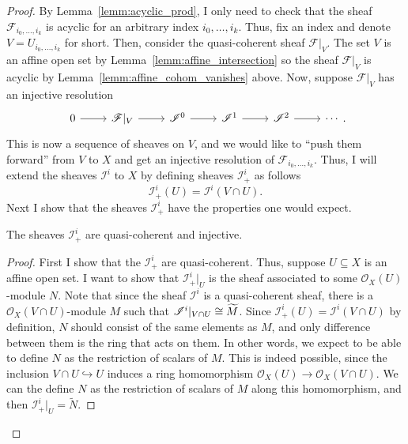 \begin{proof} %
  By Lemma~\ref{lemm:acyclic_prod}, I only need to check that the sheaf
  $\mathscr{F}_{i_{0},\ldots,i_{k}}$ is acyclic for an arbitrary index
  $i_{0},\ldots,i_{k}$. Thus, fix an index and denote $V=U_{i_{0},\ldots,i_{k}}$
  for short. Then, consider the quasi-coherent sheaf $\mathscr{F}\vert_{V}$.
  The set $V$ is an affine open set by Lemma~\ref{lemm:affine_intersection}
  so the sheaf $\mathscr{F}\vert_{V}$ is acyclic by
  Lemma~\ref{lemm:affine_cohom_vanishes} above. Now, suppose
  $\mathscr{F}\vert_{V}$ has an injective resolution
  \[\begin{tikzcd}
      0\rar & \mathscr{F}\vert_{V}\rar & \mathscr{I}^{0}\rar
      & \mathscr{I}^{1}\rar & \mathscr{I}^{2}\rar & \cdots
    \end{tikzcd}.\]
  This is now a sequence of sheaves on $V$, and we would like to
  ``push them forward'' from $V$ to $X$ and get an injective resolution of
  $\mathscr{F}_{i_{0},\ldots,i_{k}}$. Thus, I will extend the sheaves
  $\mathscr{I}^{i}$ to $X$ by defining sheaves $\mathscr{I}_{+}^{i}$ as follows
  \[
    \mathscr{I}_{+}^{i}(U)=\mathscr{I}^{i}(V\cap U).
  \]
  Next I show that the sheaves $\mathscr{I}_{+}^{i}$ have the properties
  one would expect.
  \begin{claim}
    The sheaves $\mathscr{I}_{+}^{i}$ are quasi-coherent and injective.
  \end{claim}
  {\renewcommand{\qedsymbol}{$\blacksquare$}
    \begin{proof}
      First I show that the $\mathscr{I}_{+}^{i}$ are quasi-coherent.
      Thus, suppose $U\subseteq X$ is an affine open set. I want to show
      that $\mathscr{I}_{+}^{i}\vert_{U}$ is the sheaf associated to some
      $\mathscr{O}_{X}(U)$-module $N$. Note that since the sheaf
      $\mathscr{I}^{i}$ is a quasi-coherent sheaf, there is a
      $\mathscr{O}_{X}(V\cap U)$-module $M$ such that
      $\mathscr{I}^{i}\vert_{V\cap U}\cong\widetilde{M}$. Since $\mathscr{I}_{+}^{i}(U)
      =\mathscr{I}^{i}(V\cap U)$ by definition, $N$ should consist of the same
      elements as $M$, and only difference between them is the ring that
      acts on them. In other words, we expect to be able to define $N$ as
      the restriction of scalars of $M$. This is indeed possible, since
      the inclusion $V\cap U\hookrightarrow U$ induces a ring homomorphism
      $\mathscr{O}_{X}(U)\to \mathscr{O}_{X}(V\cap U)$. We can the
      define $N$ as the restriction of scalars of $M$ along this
      homomorphism, and then $\mathscr{I}_{+}^{i}\vert_{U}=\widetilde{N}$.


\end{proof}}
\end{proof}
